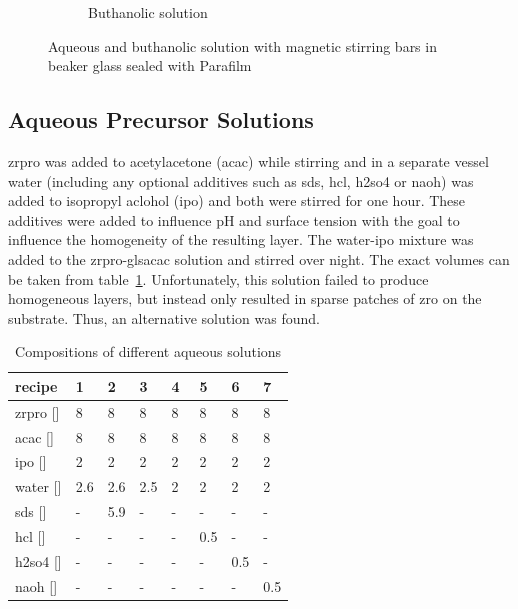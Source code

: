 \begin{figure}[htb]
\begin{subfigure}{0.49\textwidth}
		\label{fig:sol-bu}
		\caption{Buthanolic solution}
	\end{subfigure}
	\label{fig:sol}
	\caption{Aqueous and buthanolic solution with magnetic stirring bars in beaker glass sealed with Parafilm} 
\end{figure}
\fi

\subsection{Aqueous Precursor Solutions}
\label{sec:exp-sol-aq}
\gls{zrpro} was added to acetylacetone (\gls{acac}) while stirring and in a separate vessel \gls{water} 
(including any optional additives such as \gls{sds}, \gls{hcl}, \gls{h2so4} or \gls{naoh}) 
was added to isopropyl aclohol (\gls{ipo}) and both were stirred for one hour. 
These additives were added to influence pH and surface tension with the goal to influence the homogeneity of the resulting layer. %
The \gls{water}-\gls{ipo} mixture was added to the \gls{zrpro}-gls{acac} solution and stirred over night. 
The exact volumes can be taken from table~\ref{tab:rec1}.
Unfortunately, this solution failed to produce homogeneous layers, but instead only resulted in sparse patches of \gls{zro} on the substrate.
Thus, an alternative solution was found.
\begin{table}[h]
	\centering
	\caption{Compositions of different aqueous solutions}
	\label{tab:rec1}
	\begin{tabular}{llllllll}
		\hline
		recipe				&1		&2		&3		&4		&5		&6		&7\\
		\hline
		\gls{zrpro} [\ml{}]	&8		&8		&8		&8		&8		&8		&8\\
		\gls{acac}  [\ml{}]	&8		&8		&8		&8		&8		&8		&8\\
		\gls{ipo}   [\ml{}]	&2		&2		&2		&2		&2		&2		&2\\
		\gls{water} [\ml{}]	&2.6	&2.6	&2.5	&2~		&2		&2		&2\\
		\gls{sds}   [\mg{}]	&-		&5.9	&-		&-		&-		&-		&-\\
		\gls{hcl}   [\ml{}]	&-		&-		&-		&-		&0.5	&-		&-\\
		\gls{h2so4} [\ml{}]	&-		&-		&-		&-		&-		&0.5	&-\\
		\gls{naoh}  [\ml{}] &-		&-		&-		&-		&-		&-		&0.5\\
		\hline
	\end{tabular}
\end{table}
%
